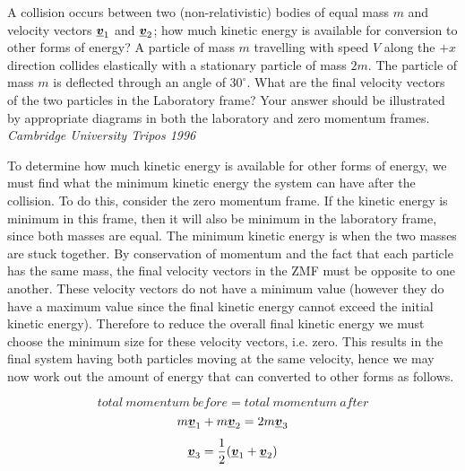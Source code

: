 
\begin{problem} %
 {
A collision occurs between two (non-relativistic) bodies of equal mass $m$ and velocity vectors $\mathit{\underline{\boldsymbol{v}}}_{1}$ and $\mathit{\underline{\boldsymbol{v}}}_{2}$; how much kinetic energy is available for conversion to other forms of energy? 
A particle of mass $m$ travelling with speed $V$ along the $+x$ direction collides elastically with a stationary particle of mass $2m$.
The particle of mass $m$ is deflected through an angle of $30^{\circ}$.  What are the final velocity vectors of the two particles in the Laboratory frame?
Your answer should be illustrated by appropriate diagrams in both the laboratory and zero momentum frames.}
{\textit{Cambridge University Tripos 1996}}
{

To determine how much kinetic energy is available for other forms of energy, we must find what the minimum kinetic energy the system can have after the collision. To do this, consider the zero momentum frame. If the kinetic energy is minimum in this frame, then it will also be minimum in the laboratory frame, since both masses are equal. The minimum kinetic energy is when the two masses are stuck together. By conservation of momentum and the fact that each particle has the same mass, the final velocity vectors in the ZMF must be opposite to one another. These velocity vectors do not have a minimum value (however they do have a maximum value since the final kinetic energy cannot exceed the initial kinetic energy). Therefore to reduce the overall final kinetic energy we must choose the minimum size for these velocity vectors, i.e. zero. This results in the final system having both particles moving at the same velocity, hence we may now work out the amount of energy that can converted to other forms as follows.

\begin{equation*}total~momentum~before=total~momentum~after\end{equation*}
\begin{equation*}m\mathit{\underline{\boldsymbol{v}}}_{1}+m\mathit{\underline{\boldsymbol{v}}}_{2}=2m\mathit{\underline{\boldsymbol{v}}}_{3}\end{equation*}
\begin{equation*}\mathit{\underline{\boldsymbol{v}}}_{3}=\frac{1}{2}(\mathit{\underline{\boldsymbol{v}}}_{1}+\mathit{\underline{\boldsymbol{v}}}_{2})\end{equation*}

}
\end{problem}
